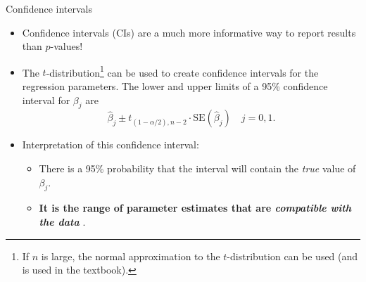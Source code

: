 \documentclass[
  10pt,
  ignorenonframetext,
]{beamer}
\providecommand{\tightlist}{%
  \setlength{\itemsep}{0pt}\setlength{\parskip}{0pt}}
\begin{document}
\begin{frame}
\begin{block}{Confidence intervals}
\protect\hypertarget{confidence-intervals}{}
\vspace{2mm}

\begin{itemize}
\tightlist
\item
  Confidence intervals (CIs) are a much more informative way to report
  results than \(p\)-values!
\end{itemize}

\vspace{1mm}

\begin{itemize}
\tightlist
\item
  The
  \(t\)-distribution\footnote{If $n$ is large, the normal approximation to the $t$-distribution can be used (and is used in the textbook).}
  can be used to create confidence intervals for the regression
  parameters. The lower and upper limits of a 95\% confidence interval
  for \(\beta_j\) are
  \[\hat{\beta}_j \pm t_{(1-\alpha/2),n-2} \cdot\text{SE} (\hat{\beta}_j) \quad j=0, 1.\]
\end{itemize}

\vspace{1mm}

\begin{itemize}
\item
  Interpretation of this confidence interval:

  \begin{itemize}
  \item
    There is a 95\% probability that the interval will contain the
    \emph{true} value of \(\beta_j\).
  \item
    \textbf{It is the range of parameter estimates that are
    \emph{compatible with the data} }.
  \end{itemize}
\end{itemize}
\end{block}
\end{frame}
\end{document}
